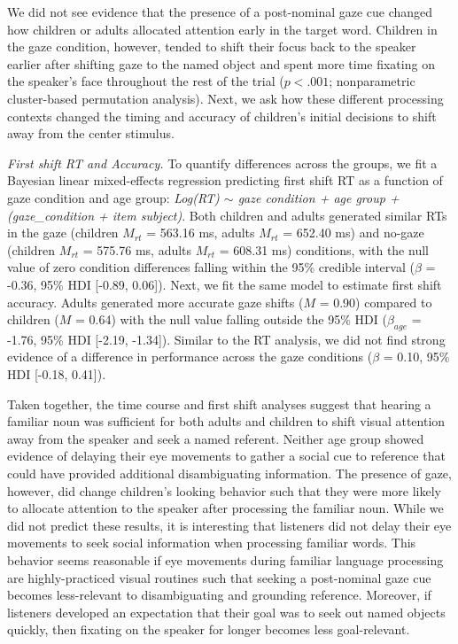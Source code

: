 \documentclass[man,floatsintext]{apa6}
\begin{document}
We did not see evidence that the presence of a post-nominal gaze cue
changed how children or adults allocated attention early in the target
word. Children in the gaze condition, however, tended to shift their
focus back to the speaker earlier after shifting gaze to the named
object and spent more time fixating on the speaker's face throughout the
rest of the trial (\(p < .001\); nonparametric cluster-based permutation
analysis). Next, we ask how these different processing contexts changed
the timing and accuracy of children's initial decisions to shift away
from the center stimulus.

\emph{First shift RT and Accuracy.} To quantify differences across the
groups, we fit a Bayesian linear mixed-effects regression predicting
first shift RT as a function of gaze condition and age group:
\emph{Log(RT) \(\sim\) gaze condition + age group + (gaze\_condition +
item \textbar{} subject)}. Both children and adults generated similar
RTs in the gaze (children \(M_{rt}\) = 563.16 ms, adults \(M_{rt}\) =
652.40 ms) and no-gaze (children \(M_{rt}\) = 575.76 ms, adults
\(M_{rt}\) = 608.31 ms) conditions, with the null value of zero
condition differences falling within the 95\% credible interval
(\(\beta\) = -0.36, 95\% HDI {[}-0.89, 0.06{]}). Next, we fit the same
model to estimate first shift accuracy. Adults generated more accurate
gaze shifts (\(M\) = 0.90) compared to children (\(M\) = 0.64) with the
null value falling outside the 95\% HDI (\(\beta_{age}\) = -1.76, 95\%
HDI {[}-2.19, -1.34{]}). Similar to the RT analysis, we did not find
strong evidence of a difference in performance across the gaze
conditions (\(\beta\) = 0.10, 95\% HDI {[}-0.18, 0.41{]}).

Taken together, the time course and first shift analyses suggest that
hearing a familiar noun was sufficient for both adults and children to
shift visual attention away from the speaker and seek a named referent.
Neither age group showed evidence of delaying their eye movements to
gather a social cue to reference that could have provided additional
disambiguating information. The presence of gaze, however, did change
children's looking behavior such that they were more likely to allocate
attention to the speaker after processing the familiar noun. While we
did not predict these results, it is interesting that listeners did not
delay their eye movements to seek social information when processing
familiar words. This behavior seems reasonable if eye movements during
familiar language processing are highly-practiced visual routines such
that seeking a post-nominal gaze cue becomes less-relevant to
disambiguating and grounding reference. Moreover, if listeners developed
an expectation that their goal was to seek out named objects quickly,
then fixating on the speaker for longer becomes less goal-relevant.
\end{document}
